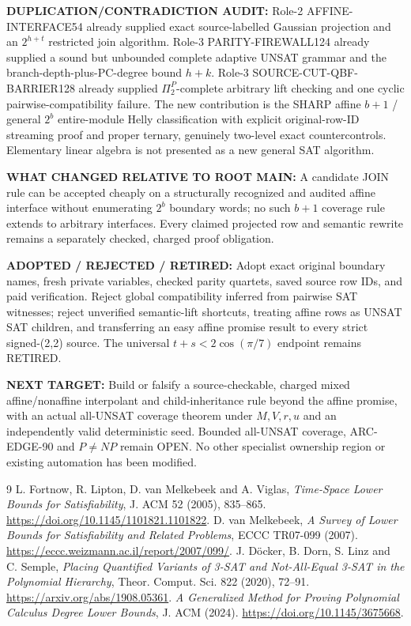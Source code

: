 \documentclass[11pt]{article}
\begin{document}
\textbf{DUPLICATION/CONTRADICTION AUDIT:} Role-2 AFFINE-INTERFACE54 already supplied exact source-labelled Gaussian projection and an $2^{h+t}$ restricted join algorithm. Role-3 PARITY-FIREWALL124 already supplied a sound but unbounded complete adaptive UNSAT grammar and the branch-depth-plus-PC-degree bound $h+k$. Role-3 SOURCE-CUT-QBF-BARRIER128 already supplied $\Pi_2^P$-complete arbitrary lift checking and one cyclic pairwise-compatibility failure. The new contribution is the SHARP affine $b+1$ / general $2^b$ entire-module Helly classification with explicit original-row-ID streaming proof and proper ternary, genuinely two-level exact countercontrols. Elementary linear algebra is not presented as a new general SAT algorithm.

\textbf{WHAT CHANGED RELATIVE TO ROOT MAIN:} A candidate JOIN rule can be accepted cheaply on a structurally recognized and audited affine interface without enumerating $2^b$ boundary words; no such $b+1$ coverage rule extends to arbitrary interfaces. Every claimed projected row and semantic rewrite remains a separately checked, charged proof obligation.

\textbf{ADOPTED / REJECTED / RETIRED:} Adopt exact original boundary names, fresh private variables, checked parity quartets, saved source row IDs, and paid verification. Reject global compatibility inferred from pairwise SAT witnesses; reject unverified semantic-lift shortcuts, treating affine rows as UNSAT SAT children, and transferring an easy affine promise result to every strict signed-(2,2) source. The universal $t+s<2\cos(\pi/7)$ endpoint remains RETIRED.

\textbf{NEXT TARGET:} Build or falsify a source-checkable, charged mixed affine/nonaffine interpolant and child-inheritance rule beyond the affine promise, with an actual all-UNSAT coverage theorem under $M,V,r,u$ and an independently valid deterministic seed. Bounded all-UNSAT coverage, ARC-EDGE-90 and $P\ne NP$ remain OPEN. No other specialist ownership region or existing automation has been modified.

\begin{thebibliography}{9}
 L. Fortnow, R. Lipton, D. van Melkebeek and A. Viglas, \emph{Time-Space Lower Bounds for Satisfiability}, J. ACM 52 (2005), 835--865. \url{https://doi.org/10.1145/1101821.1101822}.
 D. van Melkebeek, \emph{A Survey of Lower Bounds for Satisfiability and Related Problems}, ECCC TR07-099 (2007). \url{https://eccc.weizmann.ac.il/report/2007/099/}.
 J. D\"ocker, B. Dorn, S. Linz and C. Semple, \emph{Placing Quantified Variants of 3-SAT and Not-All-Equal 3-SAT in the Polynomial Hierarchy}, Theor. Comput. Sci. 822 (2020), 72--91. \url{https://arxiv.org/abs/1908.05361}.
 \emph{A Generalized Method for Proving Polynomial Calculus Degree Lower Bounds}, J. ACM (2024). \url{https://doi.org/10.1145/3675668}.
\end{thebibliography}
\end{document}
